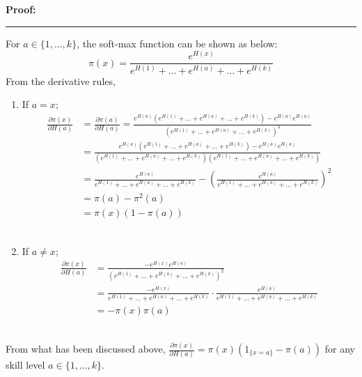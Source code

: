 \documentclass[10.5pt]{article}
\newcommand\Proof{\vspace{.3in}\textbf{Proof:}\vspace{.5em}\hrule\vspace{.08in}\par}
\begin{document}
\begin{enumerate}[(a)]
	\Proof{}
	For $a\in\{1,...,k\}$, the soft-max function can be shown as below:
	$$\pi(x) = \frac{e^{H(x)}}{e^{H(1)}+\dots+e^{H(a)}+\dots+e^{H(k)}}$$
	From the derivative rules,\\[8pt]
	\begin{enumerate}[(1)]
		\item If $a = x$;
		\begin{align*}
			\frac{\partial \pi(x)}{\partial H(a)} &= \frac{\partial \pi(a)}{\partial H(a)} = \frac{e^{H(a)}(e^{H(1)}+\dots+e^{H(a)}+\dots+e^{H(k)}) - e^{H(a)}e^{H(a)}}{(e^{H(1)}+\dots+e^{H(a)}+\dots+e^{H(k)})^2}\\[8pt]
			&=\frac{e^{H(a)}(e^{H(1)}+\dots+e^{H(a)}+\dots+e^{H(k)}) - e^{H(a)}e^{H(a)}}{(e^{H(1)}+\dots+e^{H(a)}+\dots+e^{H(k)})(e^{H(1)}+\dots+e^{H(a)}+\dots+e^{H(k)})}\\[8pt]
			&=\frac{e^{H(a)}}{e^{H(1)}+\dots+e^{H(a)}+\dots+e^{H(k)}}-\left(\frac{e^{H(a)}}{e^{H(1)}+\dots+e^{H(a)}+\dots+e^{H(k)}}\right)^2\\[8pt]
			&=\pi(a) - \pi^2(a)\\[8pt]
			&=\pi(x)(1-\pi(a))
		\end{align*}\\[8pt]
		\item If $a\neq x$;
		\begin{align*}
			\frac{\partial \pi(x)}{\partial H(a)} &= \frac{ - e^{H(x)}e^{H(a)}}{(e^{H(1)}+\dots+e^{H(a)}+\dots+e^{H(k)})^2}\\[8pt]
			&=\frac{-e^{H(x)}}{e^{H(1)}+\dots+e^{H(a)}+\dots+e^{H(k)}}\cdot\frac{e^{H(a)}}{e^{H(1)}+\dots+e^{H(a)}+\dots+e^{H(k)}}\\[8pt]
			&=-\pi(x)\pi(a)
		\end{align*}
	\end{enumerate}
\ \\

	From what has been discussed above, $\frac{\partial \pi(x)}{\partial H(a)} = \pi(x)(1_{\{x=a\}}-\pi(a))$ for any skill level $a\in\{1,...,k\}$.




\end{enumerate}
	
\end{document}
